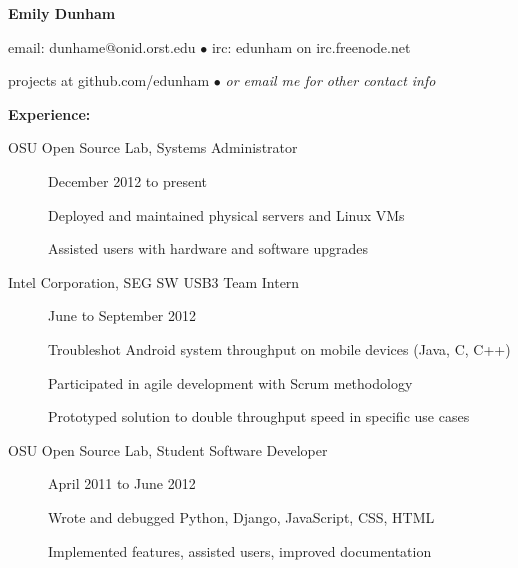\documentclass[11pt]{article}
\begin{document}
\centerline{{\LARGE \bf Emily Dunham}}

\bigskip

\centerline{email: dunhame@onid.orst.edu
        $\bullet$
        irc: edunham on irc.freenode.net}
\centerline{projects at github.com/edunham
        $\bullet$
        \emph{or email me for other contact info}}

\bigskip
\hrulefill
\bigskip

{\Large \bf Experience:}
\begin{description}
\item[OSU Open Source Lab, Systems Administrator]
    \hfill December 2012 to present

    Deployed and maintained physical servers and Linux VMs

    Assisted users with hardware and software upgrades

\item[Intel Corporation, SEG SW USB3 Team Intern]
    \hfill June to September 2012

    Troubleshot Android system throughput on mobile devices (Java, C, C++)

    Participated in agile development with Scrum methodology

    Prototyped solution to double throughput speed in specific use cases

\item[OSU Open Source Lab, Student Software Developer]
    \hfill April 2011 to June 2012

    Wrote and debugged Python, Django, JavaScript, CSS, HTML

    Implemented features, assisted users, improved documentation
\end{description}

\smallskip
\hrulefill
\bigskip
\end{document}
